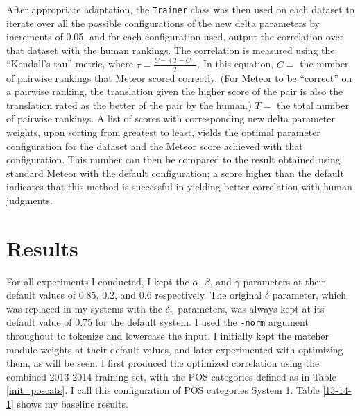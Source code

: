 \documentclass[paper=a4, fontsize=11pt]{scrartcl}
\numberwithin{equation}{section}		%
\numberwithin{figure}{section}			%
\numberwithin{table}{section}				%
\begin{document}
After appropriate adaptation, the \texttt{Trainer} class was then used on each dataset to iterate over all the possible configurations of the new delta parameters by increments of 0.05, and for each configuration used, output the correlation over that dataset with the human rankings.  The correlation is measured using the ``Kendall's tau'' metric, where $\tau = \frac{C - (T - C)}{T}$.  In this equation, $C = $ the number of pairwise rankings that Meteor scored correctly.  (For Meteor to be ``correct'' on a pairwise ranking, the translation given the higher score of the pair is also the translation rated as the better of the pair by the human.)  $T = $ the total number of pairwise rankings.  A list of scores with corresponding new delta parameter weights, upon sorting from greatest to least, yields the optimal parameter configuration for the dataset and the Meteor score achieved with that configuration.  This number can then be compared to the result obtained using standard Meteor with the default configuration; a score higher than the default indicates that this method is successful in yielding better correlation with human judgments.

\section{Results}

For all experiments I conducted, I kept the $\alpha$, $\beta$, and $\gamma$ parameters at their default values of 0.85, 0.2, and 0.6 respectively.  The original $\delta$ parameter, which was replaced in my systems with the $\delta_n$ parameters, was always kept at its default value of 0.75 for the default system.  I used the \texttt{-norm} argument throughout to tokenize and lowercase the input.  I initially kept the matcher module weights at their default values, and later experimented with optimizing them, as will be seen.  I first produced the optimized correlation using the combined 2013-2014 training set, with the POS categories defined as in Table \ref{init_poscats}.  I call this configuration of POS categories System 1.  Table \ref{13-14-1} shows my baseline results.
\end{document}

